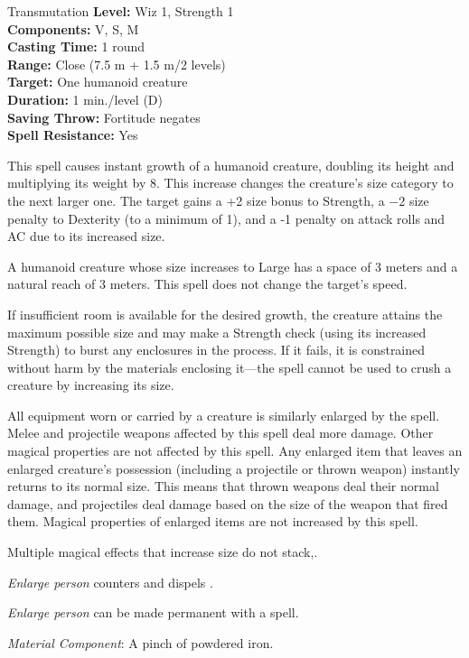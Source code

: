 {Transmutation}
{
	\textbf{Level:}
	Wiz 1, Strength 1\\
	\textbf{Components:}
	V, S, M\\
	\textbf{Casting Time:}
	1 round\\
	\textbf{Range:}
	Close (7.5 m + 1.5 m/2 levels)\\
	\textbf{Target:}
	One humanoid creature\\
	\textbf{Duration:}
	1 min./level (D)\\
	\textbf{Saving Throw:}
	Fortitude negates\\
	\textbf{Spell Resistance:}
	Yes\\
}
{
	This spell causes instant growth of a humanoid creature, doubling its height and multiplying its weight by 8. This increase changes the creature's size category to the next larger one. The target gains a +2 size bonus to Strength, a $-2$ size penalty to Dexterity (to a minimum of 1), and a -1 penalty on attack rolls and AC due to its increased size.

	A humanoid creature whose size increases to Large has a space of 3 meters and a natural reach of 3 meters. This spell does not change the target's speed.

	If insufficient room is available for the desired growth, the creature attains the maximum possible size and may make a Strength check (using its increased Strength) to burst any enclosures in the process. If it fails, it is constrained without harm by the materials enclosing it---the spell cannot be used to crush a creature by increasing its size.

	All equipment worn or carried by a creature is similarly enlarged by the spell. Melee and projectile weapons affected by this spell deal more damage. Other magical properties are not affected by this spell. Any enlarged item that leaves an enlarged creature's possession (including a projectile or thrown weapon) instantly returns to its normal size. This means that thrown weapons deal their normal damage, and projectiles deal damage based on the size of the weapon that fired them. Magical properties of enlarged items are not increased by this spell.

	Multiple magical effects that increase size do not stack,.

	\emph{Enlarge person} counters and dispels .

	\emph{Enlarge person} can be made permanent with a  spell.

	\textit{Material Component}:
	A pinch of powdered iron.

}
